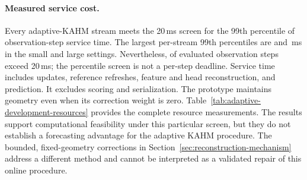 \paragraph{Measured service cost.}
Every adaptive-KAHM stream meets the 20\,ms screen for the 99th
percentile of observation-step service time. The largest per-stream
99th percentiles are \ADSmallPninetyNine{} and
\ADLargePninetyNine{}\,ms in the small and large settings. Nevertheless,
\ADOverruns{} of \ADServiceSteps{} evaluated observation steps exceed
20\,ms; the percentile screen is not a per-step deadline. Service time
includes updates, reference refreshes, feature and head reconstruction,
and prediction. It excludes scoring and serialization. The prototype
maintains geometry even when its correction weight is zero.
Table~\ref{tab:adaptive-development-resources} provides the complete
resource measurements. The results support computational feasibility
under this particular screen, but they do not establish a forecasting
advantage for the adaptive KAHM procedure. The bounded, fixed-geometry
corrections in Section~\ref{sec:reconstruction-mechanism} address a
different method and cannot be interpreted as a validated repair of
this online procedure.
